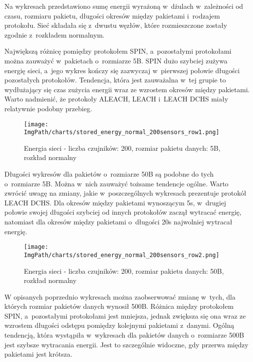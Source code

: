 Na wykresach przedstawiono sumę energii wyrażoną w~dżulach w~zależności od czasu, rozmiaru pakietu, długości okresów między pakietami i~rodzajem protokołu. Sieć składała się z~dwustu węzłów, które rozmieszczone zostały zgodnie z~rozkładem normalnym.

Największą różnicę pomiędzy protokołem SPIN, a~pozostałymi protokołami można zauważyć w~pakietach o~rozmiarze 5B. SPIN dużo szybciej zużywa energię sieci, a~jego wykres kończy się zazwyczaj w~pierwszej połowie długości pozostałych protokołów. Tendencja, która jest zauważalna w~tej grupie to wydłużający się czas zużycia energii wraz ze wzrostem okresów między pakietami. Warto nadmienić, że protokoły ALEACH, LEACH i~LEACH DCHS miały relatywnie podobny przebieg.

\begin{figure}[H]
	\begin{center}
		\texttt{[image: \\ImgPath/charts/stored\_energy\_normal\_200sensors\_row1.png]}
	\end{center}
	\caption{Energia sieci - liczba czujników: 200, rozmiar pakietu danych: 5B, rozkład normalny}
\end{figure}

Długości wykresów dla pakietów o~rozmiarze 50B są podobne do tych o~rozmiarze 5B. Można w~nich zauważyć tożsame tendencje ogólne. Warto zwrócić uwagę na zmiany, jakie w~poszczególnych wykresach prezentuje protokół LEACH DCHS. Dla okresów między pakietami wynoszącym 5s, w~drugiej połowie swojej długości szybciej od innych protokołów zaczął wytracać energię, natomiast dla okresów między pakietami o~długości 20s najwolniej wytracał energię.

\begin{figure}[H]
	\begin{center}
		\texttt{[image: \\ImgPath/charts/stored\_energy\_normal\_200sensors\_row2.png]}
	\end{center}
	\caption{Energia sieci - liczba czujników: 200, rozmiar pakietu danych: 50B, rozkład normalny}
\end{figure}

W opisanych poprzednio wykresach można zaobserwować zmianę w~tych, dla których rozmiar pakietów danych wynosił 500B. Różnica między protokołem SPIN, a~pozostałymi protokołami jest mniejsza, jednak zwiększa się ona wraz ze wzrostem długości odstępu pomiędzy kolejnymi pakietami z~danymi. Ogólną tendencją, która wystąpiła w~wykresach dla pakietów danych o~rozmiarze 500B jest szybsze wytracania energii. Jest to szczególnie widoczne, gdy przerwa między pakietami jest krótsza.

